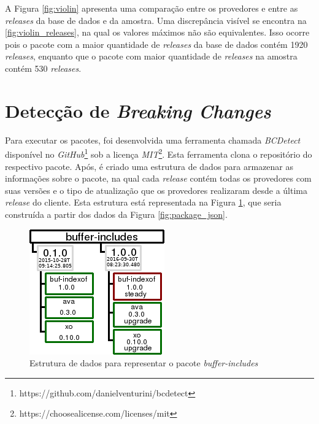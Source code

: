 A Figura \ref{fig:violin} apresenta uma comparação entre os provedores e entre as \textit{releases} da base de dados e da amostra. Uma discrepância visível se encontra na \ref{fig:violin_releases}, na qual os valores máximos não são equivalentes. Isso ocorre pois o pacote com a maior quantidade de \textit{releases} da base de dados contém 1920 \textit{releases}, enquanto que o pacote com maior quantidade de \textit{releases} na amostra contém 530 \textit{releases}.

\section{Detecção de \textit{Breaking Changes}}
\label{sec:bcdetect}
Para executar os pacotes, foi desenvolvida uma ferramenta chamada \textit{BCDetect} disponível no \textit{GitHub}\footnote{https://github.com/danielventurini/bcdetect} sob a licença \textit{MIT}\footnote{https://choosealicense.com/licenses/mit}. Esta ferramenta clona o repositório do respectivo pacote. Após, é criado uma estrutura de dados para armazenar as informações sobre o pacote, na qual cada \textit{release} contém todas os provedores com suas versões e o tipo de atualização que os provedores realizaram desde a última \textit{release} do cliente. Esta estrutura está representada na Figura \ref{fig:bc_work}, que seria construída a partir dos dados da Figura \ref{fig:package_json}.

\begin{figure}
    \centering
    \includegraphics[scale=2]{figuras/bcdetect_work.png}
    \caption{Estrutura de dados para representar o pacote \textit{buffer-includes}}
    \label{fig:bc_work}
\end{figure}{}

